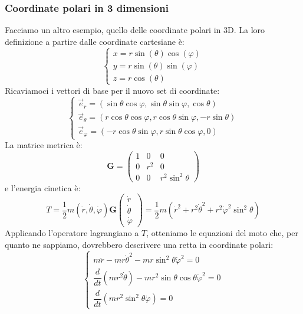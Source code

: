 \documentclass[a4paper,openany]{article}
\begin{document}
	\subsubsection{Coordinate polari in 3 dimensioni}
	Facciamo un altro esempio, quello delle coordinate polari in 3D. La loro definizione a partire dalle coordinate cartesiane è:
	\begin{equation}
		\begin{cases}
			x = r\sin(\theta)\cos(\varphi) \\
			y = r\sin(\theta)\sin(\varphi) \\
			z = r\cos(\theta)
		\end{cases}
	\end{equation}
	Ricaviamoci i vettori di base per il nuovo set di coordinate:
	\begin{equation}
		\begin{cases}
			\vec{e}_{r} = (\sin\theta\cos\varphi,\sin\theta\sin\varphi, \cos\theta) \\
			\vec{e}_{\theta} = (r\cos\theta\cos\varphi, r\cos\theta\sin\varphi, -r\sin\theta) \\
			\vec{e}_{\varphi} =(-r\cos\theta\sin\varphi, r\sin\theta\cos\varphi,0)
		\end{cases}
	\end{equation}
	La matrice metrica è:
	\begin{equation}
		\textbf{G} = 
		\begin{pmatrix}
			1 & 0 & 0 \\
			0 & r^{2} & 0 \\
			0 & 0 & r^{2}\sin^{2}\theta
		\end{pmatrix}
	\end{equation}
	e l'energia cinetica è:
	\begin{equation}
		T = \dfrac{1}{2}m (\dot{r}, \dot{\theta}, \dot{\varphi}) \textbf{G} 
		\begin{pmatrix}
			\dot{r} \\ \dot{\theta} \\ \dot{\varphi}
		\end{pmatrix}
		= \dfrac{1}{2}m(\dot{r}^{2}+r^{2}\dot{\theta}^{2}+r^{2}\dot{\varphi}^{2}\sin^{2}\theta)
	\end{equation}
	Applicando l'operatore lagrangiano a $T$, otteniamo le equazioni del moto che, per quanto ne sappiamo, dovrebbero descrivere una retta in coordinate polari:
	\begin{equation}
		\begin{cases}
			m\ddot{r} - mr\dot{\theta}^{2} - mr\sin^{2}\theta\dot{\varphi}^{2} = 0 \\
			\dfrac{d}{dt}(mr^{2}\dot{\theta}) - mr^{2}\sin\theta\cos\theta\dot{\varphi}^{2} = 0 \\
			\dfrac{d}{dt}(mr^{2}\sin^{2}\theta\dot{\varphi}) = 0
		\end{cases}
	\end{equation}
\end{document}
